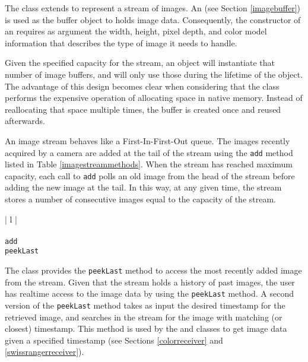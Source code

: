 The \ImageStream{} class extends \Stream{} to represent a stream of images. An \ImageBuffer{} (see Section
\ref{imagebuffer}) is used as the buffer object to holds image data. Consequently, the constructor of an 
\ImageStream{} requires as argument the width, height, pixel depth, and color model information that 
describes the type of image it needs to handle. 

Given the specified capacity for the stream, an \ImageStream{} object will instantiate that number of image 
buffers, and will only use those during the lifetime of the object. The advantage of this design becomes clear 
when considering that the \ImageBuffer{} class performs the expensive operation of allocating space in native 
memory. Instead of reallocating that space multiple times, the buffer is created once and reused afterwards.

An image stream behaves like a First-In-First-Out queue. The images recently acquired by a camera are 
added at the tail of the stream using the \texttt{add} method listed in Table \ref{imagestreammethods}. When 
the stream has reached maximum capacity, each call to \texttt{add} polls an old image from the head of the 
stream before adding the new image at the tail. In this way, at any given time, the stream stores a number of 
consecutive images equal to the capacity of the stream.

\begin{table}[ht]
\caption{Public methods in the \ImageStream{} class}
\begin{center}
\begin{tabular}{| l |}
	\hline 
	 \\
	 \\
	\hline \hline
	\texttt{add} \\
	\texttt{peekLast} \\
	\hline
\end{tabular}
\end{center}
\label{imagestreammethods}
\end{table}

The \ImageStream{} class provides the \texttt{peek\-Last} method to access the most recently added image 
from the stream. Given that the stream holds a history of past images, the user has realtime access to the 
image data by using the \texttt{peek\-Last} method. A second version of the \texttt{peek\-Last} method takes
as input the desired timestamp for the retrieved image, and searches in the stream for the image with 
matching (or closest) timestamp. This method is used by the \ColorReceiver{} and \SwissRangerReceiver{} 
classes to get image data given a specified timestamp (see Sections \ref{colorreceiver} and 
\ref{swissrangerreceiver}). 
